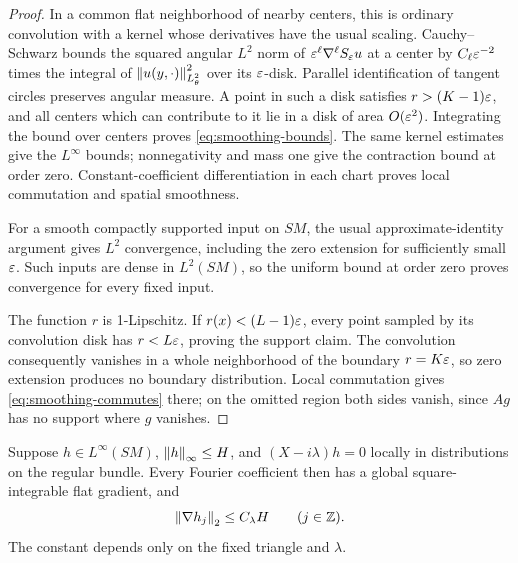 \begin{proof}
In a common flat neighborhood of nearby centers, this is ordinary
convolution with a kernel whose derivatives have the usual scaling.
Cauchy--Schwarz bounds the squared angular \(L^2\) norm of
\(\varepsilon^\ell\nabla^\ell S_\varepsilon u\) at a center by
\(C_\ell\varepsilon^{-2}\) times the integral of
\(\left\lVert u(y,\cdot)\right\rVert_{L^2_\theta}^2\) over its \(\varepsilon\)-disk.
Parallel identification of tangent circles preserves angular measure.
A point in such a disk satisfies \(r>(K-1)\varepsilon\), and all centers
which can contribute to it lie in a disk of area \(O(\varepsilon^2)\).
Integrating the bound over centers proves
\eqref{eq:smoothing-bounds}. The same kernel estimates give the
\(L^\infty\) bounds; nonnegativity and mass one give the contraction
bound at order zero. Constant-coefficient differentiation in each
chart proves local commutation and spatial smoothness.

For a smooth compactly supported input on \(SM\), the usual
approximate-identity argument gives \(L^2\) convergence, including
the zero extension for sufficiently small \(\varepsilon\). Such inputs
are dense in \(L^2(SM)\), so the uniform bound at order zero proves
convergence for every fixed input.

The function \(r\) is 1-Lipschitz. If \(r(x)<(L-1)\varepsilon\), every
point sampled by its convolution disk has \(r<L\varepsilon\), proving
the support claim. The convolution consequently vanishes in a whole
neighborhood of the boundary \(r=K\varepsilon\), so zero extension produces
no boundary distribution. Local commutation gives
\eqref{eq:smoothing-commutes} there; on the omitted region both sides
vanish, since \(Ag\) has no support where \(g\) vanishes.
\end{proof}

\begin{lemma}\label{lem:bounded-modes}
Suppose \(h\in L^\infty(SM)\), \(\left\lVert h\right\rVert_\infty\le H\), and
\((X-i\lambda)h=0\) locally in distributions on the regular bundle.
Every Fourier coefficient then has a global square-integrable flat
gradient, and
\begin{equation}\label{eq:bounded-modes}
 \left\lVert\nabla h_j\right\rVert_2\le C_\lambda H\qquad(j\in\mathbb Z).
\end{equation}
The constant depends only on the fixed triangle and \(\lambda\).
\end{lemma}

